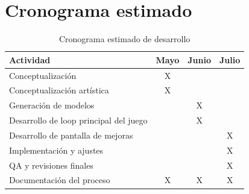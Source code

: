 \section{Cronograma estimado}

\begin{table}[H]
    \centering
    \begin{tabular}{|p{4.5cm}|c|c|c|}
        \hline
        \textbf{Actividad} & \textbf{Mayo} & \textbf{Junio} & \textbf{Julio} \\
        \hline
        Conceptualización & X & & \\
        \hline
        Conceptualización artística & X & & \\
        \hline
        Generación de modelos & & X & \\
        \hline
        Desarrollo de loop principal del juego & & X & \\
        \hline
        Desarrollo de pantalla de mejoras & & & X \\
        \hline
        Implementación y ajustes & & & X \\
        \hline
        QA y revisiones finales & & & X \\
        \hline
        Documentación del proceso & X & X & X \\
        \hline
    \end{tabular}
    \caption{Cronograma estimado de desarrollo}
    \label{tab:cronograma}
\end{table}
